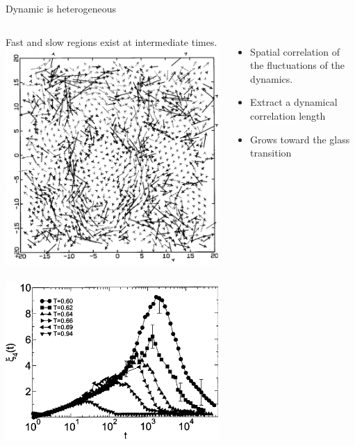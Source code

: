 \documentclass{beamer}
\begin{document}
\begin{frame}{Dynamic is heterogeneous}
	\begin{columns}
	Fast and slow regions exist at intermediate times.\\
	\includegraphics[width=\columnwidth]{dh_perera}\\
	{\footnotesize\citet{Perera1999}}
	{\footnotesize\citet{Lacevic2003}}\\
	\includegraphics[width=0.7\columnwidth]{xi4_lacevic}\\
	\begin{itemize}
		\item Spatial correlation of the fluctuations of the dynamics.
		\item Extract a dynamical correlation length
		\item Grows toward the glass transition
	\end{itemize}
	\end{columns}
\end{frame}
\end{document}
